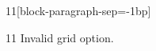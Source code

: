 \documentclass[paper=A4]{ropas-poster}
\begin{document}
\begin{postergrid}{1}{1}[block-paragraph-sep=-1bp]
\begin{posterblock}{1}{1}
Invalid grid option.
\end{posterblock}
\end{postergrid}
\end{document}
